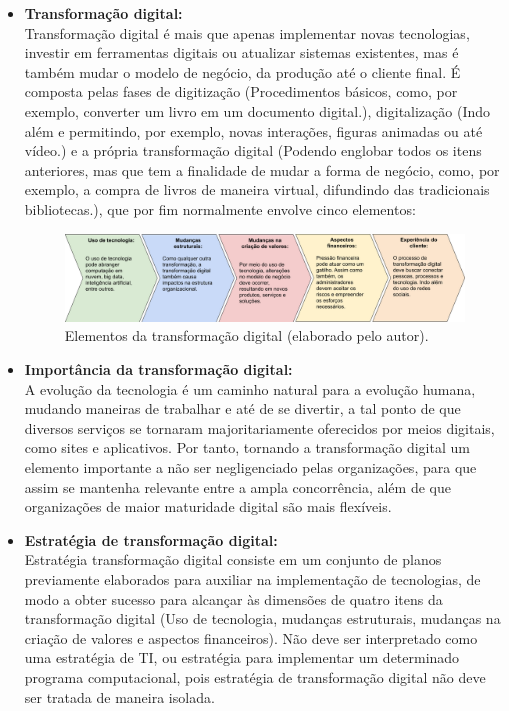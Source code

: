 \begin{itemize}
    \item \textbf{Transformação digital:}\\
    Transformação digital é mais que apenas implementar novas tecnologias, investir em ferramentas digitais ou atualizar sistemas existentes, mas é também mudar o modelo de negócio, da produção até o cliente final. É composta pelas fases de digitização (Procedimentos básicos, como, por exemplo, converter um livro em um documento digital.), digitalização (Indo além e permitindo, por exemplo, novas interações, figuras animadas ou até vídeo.) e a própria transformação digital (Podendo englobar todos os itens anteriores, mas que tem a finalidade de mudar a forma de negócio, como, por exemplo, a compra de livros de maneira virtual, difundindo das tradicionais bibliotecas.), que por fim normalmente envolve cinco elementos:
    
    \setcounter{figure}{0}
    \begin{figure}[!htpb]
        \centering
        \includegraphics[scale=0.32]{figuras/elementosTD.png}
        \caption{Elementos da transformação digital (elaborado pelo autor).}
        \label{fig:elementosTD}
    \end{figure}
    
    \item \textbf{Importância da transformação digital:}\\
    A evolução da tecnologia é um caminho natural para a evolução humana, mudando maneiras de trabalhar e até de se divertir, a tal ponto de que diversos serviços se tornaram majoritariamente oferecidos por meios digitais, como sites e aplicativos. Por tanto, tornando a transformação digital um elemento importante a não ser negligenciado pelas organizações, para que assim se mantenha relevante entre a ampla concorrência, além de que organizações de maior maturidade digital são mais flexíveis.
    
    \item \textbf{Estratégia de transformação digital:}\\
    Estratégia transformação digital consiste em um conjunto de planos previamente elaborados para auxiliar na implementação de tecnologias, de modo a obter sucesso para alcançar às dimensões de quatro itens da transformação digital (Uso de tecnologia, mudanças estruturais, mudanças na criação de valores e aspectos financeiros). Não deve ser interpretado como uma estratégia de TI, ou estratégia para implementar um determinado programa computacional, pois estratégia de transformação digital não deve ser tratada de maneira isolada.
    

\end{itemize}
